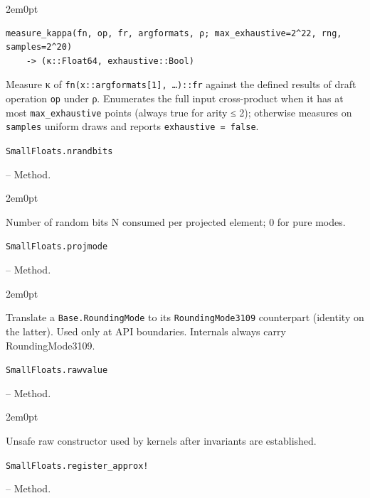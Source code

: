 \begin{adjustwidth}{2em}{0pt}


\begin{verbatim}
measure_kappa(fn, op, fr, argformats, ρ; max_exhaustive=2^22, rng, samples=2^20)
    -> (κ::Float64, exhaustive::Bool)
\end{verbatim}

Measure κ of \texttt{fn(x::argformats[1], …)::fr} against the defined results of draft operation \texttt{op} under ρ. Enumerates the full input cross-product when it has at most \texttt{max\_exhaustive} points (always true for arity ≤ 2); otherwise measures on \texttt{samples} uniform draws and reports \texttt{exhaustive = false}.



\end{adjustwidth}
\hypertarget{12405409248851917562}{\texttt{SmallFloats.nrandbits}}  -- {Method.}

\begin{adjustwidth}{2em}{0pt}

Number of random bits N consumed per projected element; 0 for pure modes.



\end{adjustwidth}
\hypertarget{5547067338070232361}{\texttt{SmallFloats.projmode}}  -- {Method.}

\begin{adjustwidth}{2em}{0pt}

Translate a \texttt{Base.RoundingMode} to its \texttt{RoundingMode3109} counterpart (identity on the latter). Used only at API boundaries. Internals always carry RoundingMode3109.



\end{adjustwidth}
\hypertarget{16755457755945711135}{\texttt{SmallFloats.rawvalue}}  -- {Method.}

\begin{adjustwidth}{2em}{0pt}

Unsafe raw constructor used by kernels after invariants are established.



\end{adjustwidth}
\hypertarget{3878213895374713375}{\texttt{SmallFloats.register\_approx!}}  -- {Method.}


